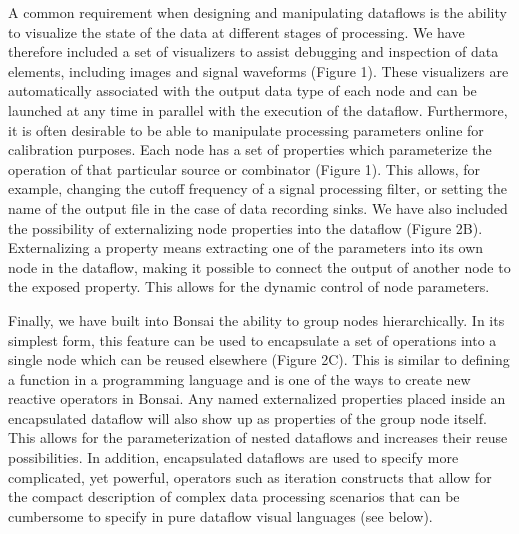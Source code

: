 A common requirement when designing and manipulating dataflows is the ability to visualize the state of the data at different stages of processing. We have therefore included a set of visualizers to assist debugging and inspection of data elements, including images and signal waveforms (Figure 1). These visualizers are automatically associated with the output data type of each node and can be launched at any time in parallel with the execution of the dataflow. Furthermore, it is often desirable to be able to manipulate processing parameters online for calibration purposes. Each node has a set of properties which parameterize the operation of that particular source or combinator (Figure 1). This allows, for example, changing the cutoff frequency of a signal processing filter, or setting the name of the output file in the case of data recording sinks. We have also included the possibility of externalizing node properties into the dataflow (Figure 2B). Externalizing a property means extracting one of the parameters into its own node in the dataflow, making it possible to connect the output of another node to the exposed property. This allows for the dynamic control of node parameters.

Finally, we have built into Bonsai the ability to group nodes hierarchically. In its simplest form, this feature can be used to encapsulate a set of operations into a single node which can be reused elsewhere (Figure 2C). This is similar to defining a function in a programming language and is one of the ways to create new reactive operators in Bonsai. Any named externalized properties placed inside an encapsulated dataflow will also show up as properties of the group node itself. This allows for the parameterization of nested dataflows and increases their reuse possibilities. In addition, encapsulated dataflows are used to specify more complicated, yet powerful, operators such as iteration constructs that allow for the compact description of complex data processing scenarios that can be cumbersome to specify in pure dataflow visual languages \cite{Mosconi2000} (see below).

